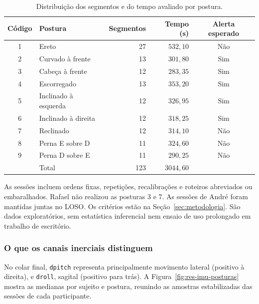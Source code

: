 \begin{table}[H]
  \centering
  \caption{Distribuição dos segmentos e do tempo avaliado por postura.}
  \label{tab:res-posturas}
  \begin{singlespace}
  \begin{tabularx}{\linewidth}{cXrrc}
    \toprule
    Código & Postura & Segmentos & Tempo (s) & Alerta esperado \\
    \midrule
    1 & Ereto                 & 27 & $532{,}10$ & Não \\
    2 & Curvado à frente      & 13 & $301{,}80$ & Sim \\
    3 & Cabeça à frente       & 12 & $283{,}35$ & Sim \\
    4 & Escorregado           & 13 & $353{,}20$ & Sim \\
    5 & Inclinado à esquerda  & 12 & $326{,}95$ & Sim \\
    6 & Inclinado à direita   & 12 & $318{,}25$ & Sim \\
    7 & Reclinado             & 12 & $314{,}10$ & Não \\
    8 & Perna E sobre D       & 11 & $324{,}60$ & Não \\
    9 & Perna D sobre E       & 11 & $290{,}25$ & Não \\
    \midrule
      & Total                & 123 & $3044{,}60$ & \\
    \bottomrule
  \end{tabularx}
  \end{singlespace}
\end{table}

As sessões incluem ordens fixas, repetições, recalibrações e roteiros
abreviados ou embaralhados. Rafael não realizou as posturas 3 e 7.
As sessões de André foram mantidas juntas no LOSO. Os critérios estão na
Seção~\ref{sec:metodologia}. São dados exploratórios, sem estatística
inferencial nem ensaio de uso prolongado em trabalho de escritório.

\subsubsection{O que os canais inerciais distinguem}

No colar final, \texttt{dpitch} representa principalmente movimento lateral
(positivo à direita), e \texttt{droll}, sagital (positivo para trás).
A Figura~\ref{fig:res-imu-posturas} mostra as medianas por sujeito e postura,
reunindo as amostras estabilizadas das sessões de cada participante.


